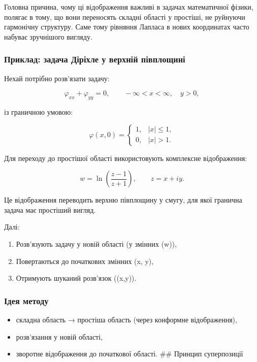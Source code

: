 \documentclass[
  ukrainian,
]{article}
\providecommand{\tightlist}{%
  \setlength{\itemsep}{0pt}\setlength{\parskip}{0pt}}
\begin{document}
Головна причина, чому ці відображення важливі в задачах математичної
фізики, полягає в тому, що вони переносять складні області у простіші,
не руйнуючи гармонічну структуру. Саме тому рівняння Лапласа в нових
координатах часто набуває зручнішого вигляду.

\subsubsection{Приклад: задача Діріхле у верхній
півплощині}\label{ux43fux440ux438ux43aux43bux430ux434-ux437ux430ux434ux430ux447ux430-ux434ux456ux440ux456ux445ux43bux435-ux443-ux432ux435ux440ux445ux43dux456ux439-ux43fux456ux432ux43fux43bux43eux449ux438ux43dux456}

Нехай потрібно розв'язати задачу:

\[
\varphi_{xx} + \varphi_{yy} = 0, \qquad -\infty < x < \infty,\quad y > 0,
\]

із граничною умовою:

\[
\varphi(x,0) =
\begin{cases}
1, & |x| \le 1, \\
0, & |x| > 1.
\end{cases}
\]

Для переходу до простішої області використовують комплексне
відображення:

\[
w = \ln\!\left(\frac{z - 1}{z + 1}\right), \qquad z = x + iy.
\]

Це відображення переводить верхню півплощину у смугу, для якої гранична
задача має простіший вигляд.

Далі:

\begin{enumerate}
\def\labelenumi{\arabic{enumi}.}
\tightlist
\item
  Розв'язують задачу у новій області (у змінних (w)),
\item
  Повертаються до початкових змінних (x, y),
\item
  Отримують шуканий розв'язок (\varphi(x,y)).
\end{enumerate}

\subsubsection{Ідея
методу}\label{ux456ux434ux435ux44f-ux43cux435ux442ux43eux434ux443}

\begin{itemize}
\tightlist
\item
  складна область → простіша область (через конформне відображення),
\item
  розв'язання у новій області,
\item
  зворотне відображення до початкової області. \#\# Принцип суперпозиції
\end{itemize}
\end{document}
